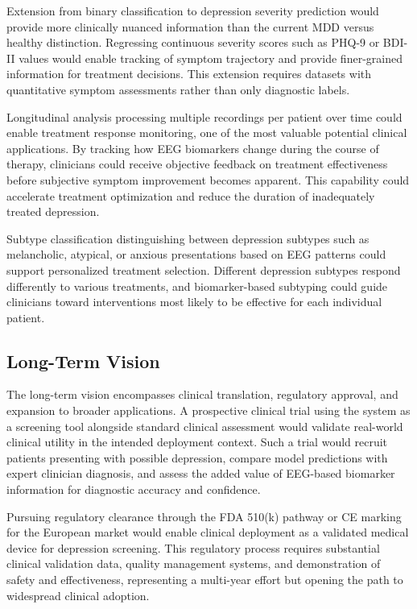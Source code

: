 Extension from binary classification to depression severity prediction would provide more clinically nuanced information than the current MDD versus healthy distinction. Regressing continuous severity scores such as PHQ-9 or BDI-II values would enable tracking of symptom trajectory and provide finer-grained information for treatment decisions. This extension requires datasets with quantitative symptom assessments rather than only diagnostic labels.

Longitudinal analysis processing multiple recordings per patient over time could enable treatment response monitoring, one of the most valuable potential clinical applications. By tracking how EEG biomarkers change during the course of therapy, clinicians could receive objective feedback on treatment effectiveness before subjective symptom improvement becomes apparent. This capability could accelerate treatment optimization and reduce the duration of inadequately treated depression.

Subtype classification distinguishing between depression subtypes such as melancholic, atypical, or anxious presentations based on EEG patterns could support personalized treatment selection. Different depression subtypes respond differently to various treatments, and biomarker-based subtyping could guide clinicians toward interventions most likely to be effective for each individual patient.

\subsection{Long-Term Vision}

The long-term vision encompasses clinical translation, regulatory approval, and expansion to broader applications. A prospective clinical trial using the system as a screening tool alongside standard clinical assessment would validate real-world clinical utility in the intended deployment context. Such a trial would recruit patients presenting with possible depression, compare model predictions with expert clinician diagnosis, and assess the added value of EEG-based biomarker information for diagnostic accuracy and confidence.

Pursuing regulatory clearance through the FDA 510(k) pathway or CE marking for the European market would enable clinical deployment as a validated medical device for depression screening. This regulatory process requires substantial clinical validation data, quality management systems, and demonstration of safety and effectiveness, representing a multi-year effort but opening the path to widespread clinical adoption.

